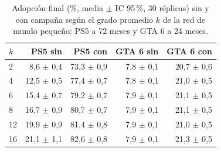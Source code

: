 \begin{table}[htb]
\centering
\caption{Adopción final (\%, media $\pm$ IC 95\,\%, 30 réplicas) sin y con campaña según el grado promedio $k$ de la red de mundo pequeño: PS5 a 72 meses y GTA 6 a 24 meses.}
\label{tab:densidad}
\small
\setlength{\tabcolsep}{4pt}
\begin{tabular}{lrrrr}
\toprule
$k$ & PS5 sin & PS5 con & GTA 6 sin & GTA 6 con \\
\midrule
2 & 8,6 $\pm$ 0,4 & 73,3 $\pm$ 0,9 & 7,8 $\pm$ 0,1 & 20,7 $\pm$ 0,6 \\
4 & 12,5 $\pm$ 0,5 & 77,4 $\pm$ 0,7 & 7,8 $\pm$ 0,1 & 21,0 $\pm$ 0,5 \\
6 & 15,4 $\pm$ 0,7 & 79,2 $\pm$ 0,7 & 7,9 $\pm$ 0,1 & 21,1 $\pm$ 0,5 \\
8 & 16,7 $\pm$ 0,9 & 80,7 $\pm$ 0,7 & 7,9 $\pm$ 0,1 & 21,1 $\pm$ 0,5 \\
12 & 19,9 $\pm$ 0,9 & 81,4 $\pm$ 0,8 & 7,9 $\pm$ 0,1 & 21,0 $\pm$ 0,5 \\
16 & 21,1 $\pm$ 1,1 & 82,6 $\pm$ 0,8 & 7,9 $\pm$ 0,1 & 21,3 $\pm$ 0,5 \\
\bottomrule
\end{tabular}
\end{table}
